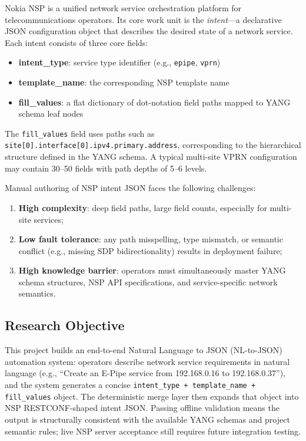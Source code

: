 \documentclass[12pt, a4paper]{article}
\newcommand{\intenttype}[1]{\texttt{#1}}
\newcommand{\yang}{\textsc{YANG}}
\newcommand{\nsp}{\textsc{NSP}}
\newcommand{\fillvalues}{\texttt{fill\_values}}
\begin{document}
Nokia \nsp{} is a unified network service orchestration platform for telecommunications operators. Its core work unit is the \emph{intent}---a declarative JSON configuration object that describes the desired state of a network service. Each intent consists of three core fields:

\begin{itemize}
  \item \textbf{intent\_type}: service type identifier (e.g., \intenttype{epipe}, \intenttype{vprn})
  \item \textbf{template\_name}: the corresponding \nsp{} template name
  \item \textbf{fill\_values}: a flat dictionary of dot-notation field paths mapped to \yang{} schema leaf nodes
\end{itemize}

\noindent
The \fillvalues{} field uses paths such as \texttt{site[0].interface[0].ipv4.primary.address}, corresponding to the hierarchical structure defined in the \yang{} schema. A typical multi-site VPRN configuration may contain 30--50 fields with path depths of 5--6 levels.

Manual authoring of \nsp{} intent JSON faces the following challenges:

\begin{enumerate}
  \item \textbf{High complexity}: deep field paths, large field counts, especially for multi-site services;
  \item \textbf{Low fault tolerance}: any path misspelling, type mismatch, or semantic conflict (e.g., missing SDP bidirectionality) results in deployment failure;
  \item \textbf{High knowledge barrier}: operators must simultaneously master \yang{} schema structures, \nsp{} API specifications, and service-specific network semantics.
\end{enumerate}

\subsection{Research Objective}

This project builds an end-to-end Natural Language to JSON (NL-to-JSON) automation system: operators describe network service requirements in natural language (e.g., ``Create an E-Pipe service from 192.168.0.16 to 192.168.0.37''), and the system generates a concise \texttt{intent\_type + template\_name + fill\_values} object. The deterministic merge layer then expands that object into NSP RESTCONF-shaped intent JSON. Passing offline validation means the output is structurally consistent with the available \yang{} schemas and project semantic rules; live NSP server acceptance still requires future integration testing.
\end{document}
